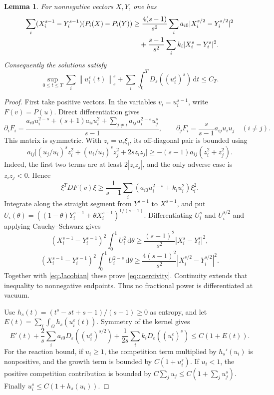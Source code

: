 \documentclass[11pt]{article}
\newtheorem{lemma}[theorem]{Lemma}
\newcommand{\eps}{\varepsilon}
\newcommand{\dd}{\,\mathrm d}
\newcommand{\Om}{\Omega}
\newcommand{\De}{D_\eps}
\newcommand{\norm}[1]{\left\lVert#1\right\rVert}
\begin{document}
\begin{lemma}\label{lem:power}
For nonnegative vectors $X,Y$, one has
\begin{align}
 \sum_i(X_i^{s-1}-Y_i^{s-1})(P_i(X)-P_i(Y))
 &\geq\frac{4(s-1)}{s^2}\sum_i a_{i0}|X_i^{s/2}-Y_i^{s/2}|^2\notag\\
 &\quad+\frac{s-1}{s^2}\sum_i k_i|X_i^s-Y_i^s|^2.\label{eq:coercivity}
\end{align}
Consequently the solutions satisfy
\begin{equation}\label{eq:powerbound}
 \sup_{0\leq t\leq T}\sum_i\norm{u_i^\eps(t)}_s^s
       +\sum_i\int_0^T\De((u_i^\eps)^s)\dd t\leq C_T.
\end{equation}
\end{lemma}
\begin{proof}
First take positive vectors. In the variables $v_i=u_i^{s-1}$, write
$F(v)=P(u)$. Direct differentiation gives
\[
 \partial_iF_i=\frac{a_{i0}u_i^{2-s}+(s+1)a_{ii}u_i^2
             +\sum_{j\ne i}a_{ij}u_i^{2-s}u_j^s}{s-1},\qquad
 \partial_jF_i=\frac{s}{s-1}a_{ij}u_iu_j\quad(i\ne j).
\]
This matrix is symmetric. With $z_i=u_i\xi_i$, its off-diagonal pair is
bounded using
\[
 a_{ij}\bigl[(u_j/u_i)^s z_i^2+(u_i/u_j)^s z_j^2+2sz_iz_j\bigr]
       \geq-(s-1)a_{ij}(z_i^2+z_j^2).
\]
Indeed, the first two terms are at least $2|z_iz_j|$, and the only adverse
case is $z_iz_j<0$. Hence
\begin{equation}\label{eq:Jacobian}
 \xi^TDF(v)\xi\geq\frac1{s-1}
          \sum_i(a_{i0}u_i^{2-s}+k_i u_i^2)\xi_i^2.
\end{equation}
Integrate along the straight segment from $Y^{s-1}$ to $X^{s-1}$, and put
$U_i(\theta)=((1-\theta)Y_i^{s-1}+\theta X_i^{s-1})^{1/(s-1)}$.
Differentiating $U_i^s$ and $U_i^{s/2}$ and applying Cauchy--Schwarz gives
\[
 (X_i^{s-1}-Y_i^{s-1})^2\int_0^1U_i^2\dd\theta
        \geq\frac{(s-1)^2}{s^2}|X_i^s-Y_i^s|^2,
\]
\[
 (X_i^{s-1}-Y_i^{s-1})^2\int_0^1U_i^{2-s}\dd\theta
        \geq\frac{4(s-1)^2}{s^2}|X_i^{s/2}-Y_i^{s/2}|^2.
\]
Together with \eqref{eq:Jacobian} these prove \eqref{eq:coercivity}.
Continuity extends that inequality to nonnegative endpoints. Thus no
fractional power is differentiated at vacuum.

Use $h_s(t)=(t^s-st+s-1)/(s-1)\geq0$ as entropy, and let
$E(t)=\sum_i\int_\Om h_s(u_i^\eps(t))$. Symmetry of the kernel gives
\begin{equation}\label{eq:entropy}
 E'(t)+\frac2s\sum_i a_{i0}\De((u_i^\eps)^{s/2})
      +\frac1{2s}\sum_i k_i\De((u_i^\eps)^s)
       \leq C(1+E(t)).
\end{equation}
For the reaction bound, if $u_i\geq1$, the competition term multiplied by
$h_s'(u_i)$ is nonpositive, and the growth term is bounded by $C(1+u_i^s)$.
If $u_i<1$, the positive competition contribution is bounded by
$C\sum_j u_j\leq C(1+\sum_j u_j^s)$. Finally
$u_i^s\leq C(1+h_s(u_i))$.


\end{proof}
\end{document}
